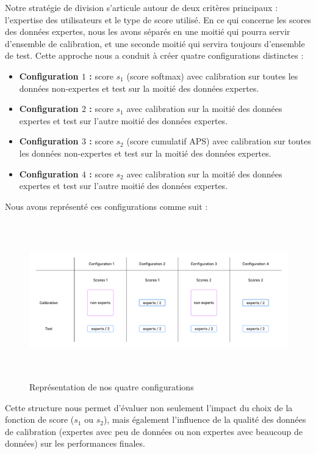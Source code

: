 \documentclass[a4paper,12pt]{article}
\begin{document}
Notre stratégie de division s'articule autour de deux critères principaux : l'expertise des utilisateurs et le type de score utilisé. En ce qui concerne les scores des données expertes, nous les avons séparés en une moitié qui pourra servir d'ensemble de calibration, et une seconde moitié qui servira toujours d'ensemble de test. Cette approche nous a conduit à créer quatre configurations distinctes : 
\begin{itemize}
    \item \textbf{Configuration $1$ :} score $s_1$ (score softmax) avec calibration sur toutes les données non-expertes et test sur la moitié des données expertes.
    \item \textbf{Configuration $2$ :} score $s_1$ avec calibration sur la moitié des données expertes et test sur l'autre moitié des données expertes.
    \item \textbf{Configuration $3$ :} score $s_2$ (score cumulatif APS) avec calibration sur toutes les données non-expertes et test sur la moitié des données expertes.
    \item \textbf{Configuration $4$ :} score $s_2$ avec calibration sur la moitié des données expertes et test sur l'autre moitié des données expertes.
\end{itemize}

\vspace{0.2cm}

Nous avons représenté ces configurations comme suit : 
\begin{figure}[H]
    \centering
    \includegraphics[height = 6.8cm]{images/Models.png}
    \caption{Représentation de nos quatre configurations}
    \label{models}
  \end{figure}

\vspace{0.2cm}

Cette structure nous permet d'évaluer non seulement l'impact du choix de la fonction de score ($s_1$ ou $s_2$), mais également l'influence de la qualité des données de calibration (expertes avec peu de données ou non expertes avec beaucoup de données) sur les performances finales.
\end{document}
